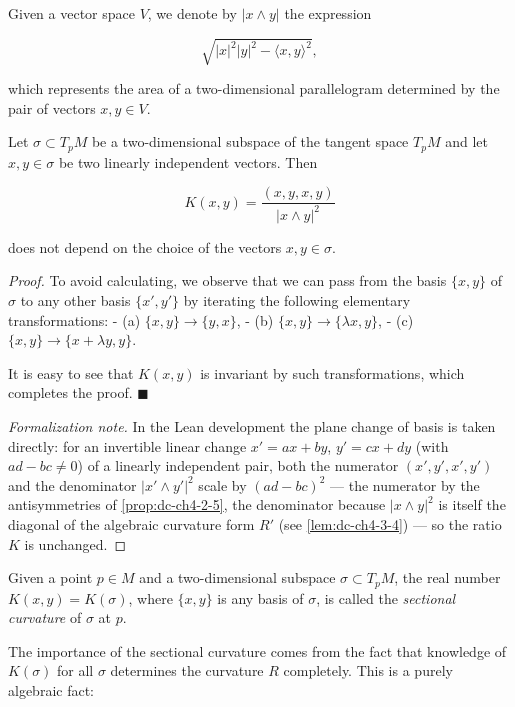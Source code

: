 Given a vector space $V$, we denote by $|x\wedge y|$ the expression

$$
\sqrt{|x|^2|y|^2-\langle x,y\rangle^2},
$$

which represents the area of a two-dimensional parallelogram determined by the
pair of vectors $x,y\in V$.

\begin{proposition}
  \label{prop:dc-ch4-3-1}
  \leanok
  Let $\sigma\subset T_pM$ be a two-dimensional subspace of the tangent space
  $T_pM$ and let $x,y\in\sigma$ be two linearly independent vectors. Then
  
  $$
  K(x,y)=\frac{(x,y,x,y)}{|x\wedge y|^2}
  $$
  
  does not depend on the choice of the vectors $x,y\in\sigma$.
\end{proposition}
\begin{proof}
  \leanok
  To avoid calculating, we observe that we can pass from the basis $\{x,y\}$
  of $\sigma$ to any other basis $\{x',y'\}$ by iterating the following elementary
  transformations:
  - (a) $\{x,y\}\to\{y,x\}$,
  - (b) $\{x,y\}\to\{\lambda x,y\}$,
  - (c) $\{x,y\}\to\{x+\lambda y,y\}$.
  
  It is easy to see that $K(x,y)$ is invariant by such transformations, which
  completes the proof. $\blacksquare$

  \emph{Formalization note.} In the Lean development the plane change of basis is
  taken directly: for an invertible linear change $x'=ax+by$, $y'=cx+dy$ (with
  $ad-bc\neq 0$) of a linearly independent pair, both the numerator $(x',y',x',y')$
  and the denominator $|x'\wedge y'|^2$ scale by $(ad-bc)^2$ — the numerator by the
  antisymmetries of \cref{prop:dc-ch4-2-5}, the denominator because $|x\wedge y|^2$
  is itself the diagonal of the algebraic curvature form $R'$ (see
  \cref{lem:dc-ch4-3-4}) — so the ratio $K$ is unchanged.
\end{proof}

\begin{definition}
  \label{def:dc-ch4-3-2}
  \leanok
  Given a point $p\in M$ and a two-dimensional subspace $\sigma\subset T_pM$, the
  real number $K(x,y)=K(\sigma)$, where $\{x,y\}$ is any basis of $\sigma$, is
  called the \emph{sectional curvature} of $\sigma$ at $p$.
  
  The importance of the sectional curvature comes from the fact that knowledge of
  $K(\sigma)$ for all $\sigma$ determines the curvature $R$ completely. This is a
  purely algebraic fact:
\end{definition}

